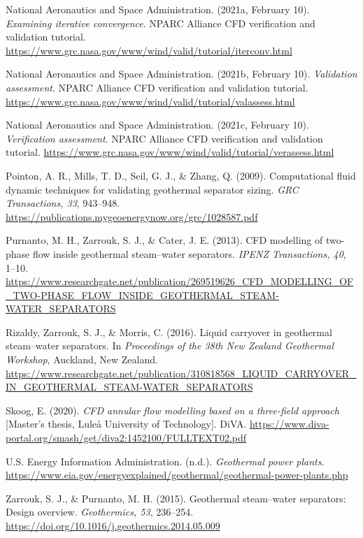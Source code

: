 \documentclass[12pt]{article}
\begin{document}
National Aeronautics and Space Administration. (2021a, February 10). \emph{Examining iterative convergence}. NPARC Alliance CFD verification and validation tutorial. \url{https://www.grc.nasa.gov/www/wind/valid/tutorial/iterconv.html}

National Aeronautics and Space Administration. (2021b, February 10). \emph{Validation assessment}. NPARC Alliance CFD verification and validation tutorial. \url{https://www.grc.nasa.gov/www/wind/valid/tutorial/valassess.html}

National Aeronautics and Space Administration. (2021c, February 10). \emph{Verification assessment}. NPARC Alliance CFD verification and validation tutorial. \url{https://www.grc.nasa.gov/www/wind/valid/tutorial/verassess.html}

Pointon, A. R., Mills, T. D., Seil, G. J., \& Zhang, Q. (2009). Computational fluid dynamic techniques for validating geothermal separator sizing. \emph{GRC Transactions, 33}, 943--948. \url{https://publications.mygeoenergynow.org/grc/1028587.pdf}

Purnanto, M. H., Zarrouk, S. J., \& Cater, J. E. (2013). CFD modelling of two-phase flow inside geothermal steam--water separators. \emph{IPENZ Transactions, 40}, 1--10. \url{https://www.researchgate.net/publication/269519626_CFD_MODELLING_OF_TWO-PHASE_FLOW_INSIDE_GEOTHERMAL_STEAM-WATER_SEPARATORS}

Rizaldy, Zarrouk, S. J., \& Morris, C. (2016). Liquid carryover in geothermal steam--water separators. In \emph{Proceedings of the 38th New Zealand Geothermal Workshop}, Auckland, New Zealand. \url{https://www.researchgate.net/publication/310818568_LIQUID_CARRYOVER_IN_GEOTHERMAL_STEAM-WATER_SEPARATORS}

Skoog, E. (2020). \emph{CFD annular flow modelling based on a three-field approach} {[}Master's thesis, Luleå University of Technology{]}. DiVA. \url{https://www.diva-portal.org/smash/get/diva2:1452100/FULLTEXT02.pdf}

U.S. Energy Information Administration. (n.d.). \emph{Geothermal power plants}. \url{https://www.eia.gov/energyexplained/geothermal/geothermal-power-plants.php}

Zarrouk, S. J., \& Purnanto, M. H. (2015). Geothermal steam--water separators: Design overview. \emph{Geothermics, 53}, 236--254. \url{https://doi.org/10.1016/j.geothermics.2014.05.009}
\end{document}

